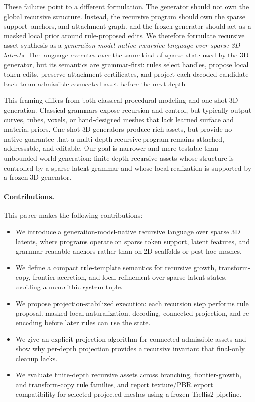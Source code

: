 These failures point to a different formulation. The generator should not own
the global recursive structure. Instead, the recursive program should own the
sparse support, anchors, and attachment graph, and the frozen generator should
act as a masked local prior around rule-proposed edits. We therefore formulate
recursive asset synthesis as a \emph{generation-model-native recursive language
over sparse 3D latents}. The language executes over the same kind of sparse
state used by the 3D generator, but its semantics are grammar-first: rules
select handles, propose local token edits, preserve attachment certificates,
and project each decoded candidate back to an admissible connected asset before
the next depth.

This framing differs from both classical procedural modeling and one-shot 3D
generation. Classical grammars expose recursion and control, but typically
output curves, tubes, voxels, or hand-designed meshes that lack learned surface
and material priors. One-shot 3D generators produce rich assets, but provide no
native guarantee that a multi-depth recursive program remains attached,
addressable, and editable. Our goal is narrower and more testable than
unbounded world generation: finite-depth recursive assets whose structure is
controlled by a sparse-latent grammar and whose local realization is supported
by a frozen 3D generator.

\paragraph{Contributions.}
This paper makes the following contributions:
\begin{itemize}
  \item We introduce a generation-model-native recursive language over sparse
  3D latents, where programs operate on sparse token support, latent features,
  and grammar-readable anchors rather than on 2D scaffolds or post-hoc meshes.
  \item We define a compact rule-template semantics for recursive growth,
  transform-copy, frontier accretion, and local refinement over sparse latent
  states, avoiding a monolithic system tuple.
  \item We propose projection-stabilized execution: each recursion step performs
  rule proposal, masked local naturalization, decoding, connected projection,
  and re-encoding before later rules can use the state.
  \item We give an explicit projection algorithm for connected admissible assets
  and show why per-depth projection provides a recursive invariant that
  final-only cleanup lacks.
  \item We evaluate finite-depth recursive assets across branching,
  frontier-growth, and transform-copy rule families, and report texture/PBR
  export compatibility for selected projected meshes using a frozen Trellis2
  pipeline.
\end{itemize}

